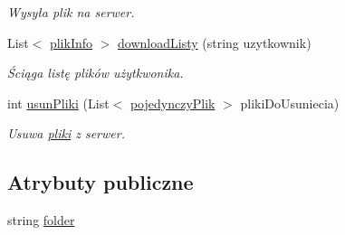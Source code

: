 \begin{CompactItemize}
\begin{CompactList}\small\item\em Wysyła plik na serwer. \item\end{CompactList}\item 
List$<$ \hyperlink{a00018}{plikInfo} $>$ \hyperlink{a00013_9ca2f36e9df9288ff32c44e789b0e576}{downloadListy} (string uzytkownik)
\begin{CompactList}\small\item\em Ściąga listę plików użytkwonika. \item\end{CompactList}\item 
int \hyperlink{a00013_302b89f984b2f9c695f1ae9462414d84}{usunPliki} (List$<$ \hyperlink{a00020}{pojedynczyPlik} $>$ plikiDoUsuniecia)
\begin{CompactList}\small\item\em Usuwa \hyperlink{a00017}{pliki} z serwer. \item\end{CompactList}\end{CompactItemize}
\subsection*{Atrybuty publiczne}
\begin{CompactItemize}
\item 
string \hyperlink{a00013_1a50c04cee4acf979e3be6b7eeb41843}{folder}
\end{CompactItemize}
